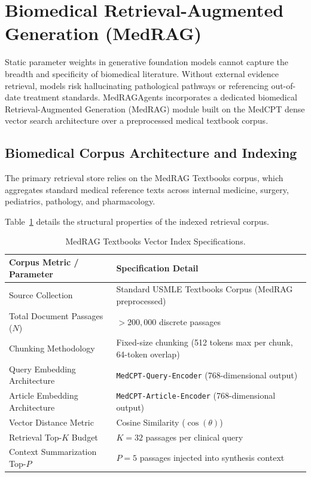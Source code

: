 \section{Biomedical Retrieval-Augmented Generation (MedRAG)}
\label{sec:retrieval_augmented_generation}

Static parameter weights in generative foundation models cannot capture the breadth and specificity of biomedical literature. Without external evidence retrieval, models risk hallucinating pathological pathways or referencing out-of-date treatment standards. MedRAGAgents incorporates a dedicated biomedical Retrieval-Augmented Generation (MedRAG) module built on the MedCPT dense vector search architecture over a preprocessed medical textbook corpus.

\subsection{Biomedical Corpus Architecture and Indexing}

The primary retrieval store relies on the MedRAG Textbooks corpus, which aggregates standard medical reference texts across internal medicine, surgery, pediatrics, pathology, and pharmacology. 

Table~\ref{tab:corpus_specs} details the structural properties of the indexed retrieval corpus.

\begin{table}[htbp]
\centering
\caption{MedRAG Textbooks Vector Index Specifications.}
\label{tab:corpus_specs}
\small
\begin{tabularx}{\textwidth}{l X}
\toprule
\textbf{Corpus Metric / Parameter} & \textbf{Specification Detail} \\
\midrule
Source Collection & Standard USMLE Textbooks Corpus (MedRAG preprocessed) \\
Total Document Passages ($N$) & $> 200,000$ discrete passages \\
Chunking Methodology & Fixed-size chunking (512 tokens max per chunk, 64-token overlap) \\
Query Embedding Architecture & \texttt{MedCPT-Query-Encoder} (768-dimensional output) \\
Article Embedding Architecture & \texttt{MedCPT-Article-Encoder} (768-dimensional output) \\
Vector Distance Metric & Cosine Similarity ($\cos(\theta)$) \\
Retrieval Top-$K$ Budget & $K = 32$ passages per clinical query \\
Context Summarization Top-$P$ & $P = 5$ passages injected into synthesis context \\
\bottomrule
\end{tabularx}
\end{table}


